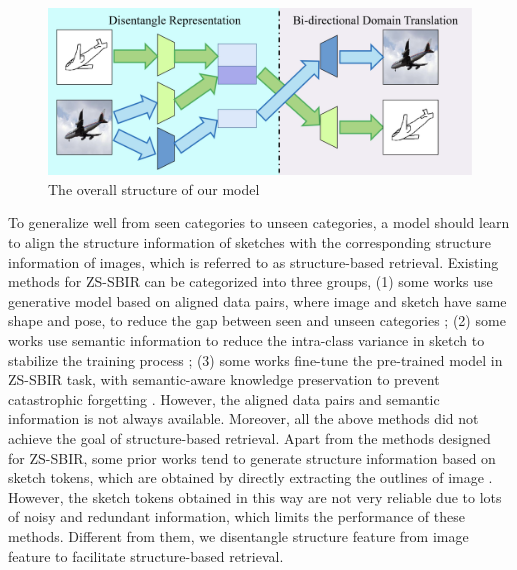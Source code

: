 \documentclass[10pt,twocolumn,letterpaper]{article}
\begin{document}
\begin{figure}
\begin{center}
\includegraphics[width=1\linewidth]{modelinshort.png}
\end{center}
   \caption{The overall structure of our model}
\label{fig:inshort}
\end{figure}

To generalize well from seen categories to unseen categories, a model should learn to align  the structure information of sketches with the corresponding structure information of images, which is referred to as structure-based retrieval.
Existing methods for ZS-SBIR can be categorized into three groups, 
(1) some works use generative model based on aligned data pairs, where image and sketch have same shape and pose, to reduce the gap between seen and unseen categories \cite{yelamarthi2018zero}; 
(2) some works use semantic information to reduce the intra-class variance in sketch to stabilize the training process \cite{xu2019semantic, wang2019stacked, dutta2019semantically, shen2018zero}; 
(3) some works fine-tune the pre-trained model in ZS-SBIR task, with semantic-aware knowledge preservation to prevent catastrophic forgetting \cite{liu2019semantic}. 
However, the aligned data pairs and semantic information is not always available. Moreover, all the above methods did not achieve the goal of structure-based retrieval. 
Apart from the methods designed for ZS-SBIR, some prior works tend to generate structure information based on sketch tokens, which are obtained by directly extracting the outlines of image \cite{liu2017deep, wang2015sketch, yu2016sketch}. However, the sketch tokens obtained in this way are not very reliable due to lots of noisy and redundant information, which limits the performance of these methods.
Different from them, we disentangle structure feature from image feature to facilitate structure-based retrieval.
\end{document}

